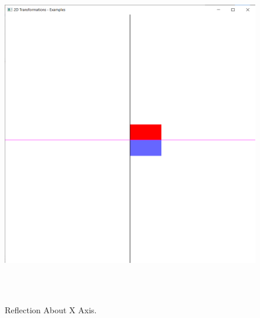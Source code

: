 \documentclass[12pt, a4]{article}
\begin{document}
\subsection*{}
\begin{figure}[h]
\centering
\caption{Reflection About X Axis.}
\includegraphics[height=15cm, width=15cm]{Outputs/Output-5.png}
\end{figure}

\newpage
\end{document}
